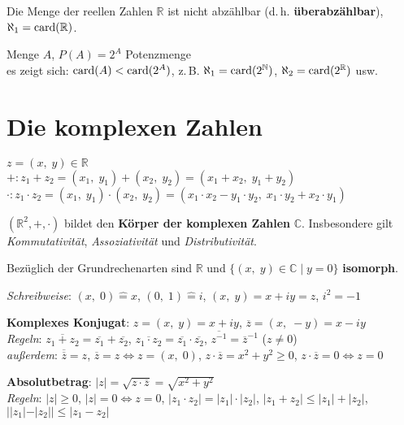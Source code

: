 Die Menge der reellen Zahlen $\mathbb{R}$ ist nicht abzählbar
(d.\,h. \textbf{überabzählbar}),
$\aleph_1 = \operatorname{card}(\mathbb{R})$.

Menge $A$, $P(A) = 2^A$ Potenzmenge \\
es zeigt sich: $\operatorname{card}(A) < \operatorname{card}(2^A)$,
z.\,B. $\aleph_1 = \operatorname{card}(2^{\mathbb{N}})$,
$\aleph_2 = \operatorname{card}(2^{\mathbb{R}})$ usw.

\pagebreak

\section{%
    Die komplexen Zahlen%
}

$z = (x,\; y) \in \mathbb{R}$ \\
$\boldsymbol{+}: z_1 + z_2 = (x_1,\; y_1) + (x_2,\; y_2) =
(x_1 + x_2,\; y_1 + y_2)$ \\
$\boldsymbol{\cdot}: z_1 \cdot z_2 = (x_1,\; y_1) \cdot (x_2,\; y_2) =
(x_1 \cdot x_2 - y_1 \cdot y_2,\; x_1 \cdot y_2 + x_2 \cdot y_1)$

$(\mathbb{R}^2, +, \cdot)$ bildet den \textbf{Körper der komplexen Zahlen}
$\mathbb{C}$. Insbesondere gilt \emph{Kommutativität}, \emph{Assoziativität}
und \emph{Distributivität}.

Bezüglich der Grundrechenarten sind $\mathbb{R}$ und
$\{(x,\; y) \in \mathbb{C} \;|\; y = 0\}$ \textbf{isomorph}.

\emph{Schreibweise}:
$(x,\; 0) \mathrel{\widehat{=}} x$, \quad
$(0,\; 1) \mathrel{\widehat{=}} i$, \quad
$(x,\; y) = x + iy = z$, \quad
$i^2 = -1$

\linie

\textbf{Komplexes Konjugat}: $z = (x,\; y) = x + iy$, \quad
$\overline{z} = (x,\; -y) = x - iy$ \\
\emph{Regeln}: $\overline{z_1 + z_2} = \overline{z_1} + \overline{z_2}$, \quad
$\overline{z_1 \cdot z_2} = \overline{z_1} \cdot \overline{z_2}$, \quad
$\overline{z^{-1}} = \overline{z}^{-1}$ ($z \not= 0$) \\
\emph{außerdem}: $\overline{\overline{z}} = z$, \quad
$\overline{z} = z \Leftrightarrow z = (x,\; 0)$, \quad
$z \cdot \overline{z} = x^2 + y^2 \ge 0$, \quad
$z \cdot \overline{z} = 0 \Leftrightarrow z = 0$

\textbf{Absolutbetrag}:
$|z| = \sqrt{z \cdot \overline{z}} = \sqrt{x^2 + y^2}$ \\
\emph{Regeln}: $|z| \ge 0$, $|z| = 0 \Leftrightarrow z = 0$,
$|z_1 \cdot z_2| = |z_1| \cdot |z_2|$, $|z_1 + z_2| \le |z_1| + |z_2|$,
$||z_1| - |z_2|| \le |z_1 - z_2|$

